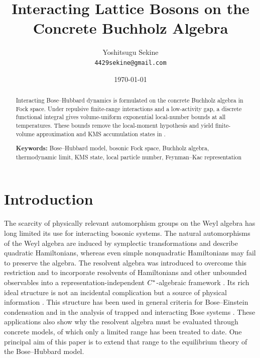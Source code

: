 \documentclass[11pt,a4paper]{article}
\title{Interacting Lattice Bosons on the Concrete Buchholz Algebra\\\vspace{0.5em}{\large All-Temperature Equilibrium States from Functional-Integral Local-Number Bounds}}
\author{%
Yoshitsugu Sekine\\{\small\texttt{4429sekine@gmail.com}}%
}
\date{\today}
\theoremstyle{plain}
\theoremstyle{definition}
\theoremstyle{remark}
\begin{document}
\maketitle

\begin{abstract}
Interacting Bose--Hubbard dynamics is formulated on the concrete Buchholz algebra in Fock space. Under repulsive finite-range interactions and a low-activity gap, a discrete functional integral gives volume-uniform exponential local-number bounds at all temperatures. These bounds remove the local-moment hypothesis and yield finite-volume approximation and KMS accumulation states in \cite{DeuchertLampartLemm001}.

\noindent\textbf{Keywords:} Bose--Hubbard model, bosonic Fock space, Buchholz algebra, thermodynamic limit, KMS state, local particle number, Feynman--Kac representation
\end{abstract}


\setcounter{tocdepth}{3}
\tableofcontents

\section{Introduction}\label{introduction}

The scarcity of physically relevant automorphism groups on the Weyl algebra has long limited its use for interacting bosonic systems. The natural automorphisms of the Weyl algebra are induced by symplectic transformations and describe quadratic Hamiltonians, whereas even simple nonquadratic Hamiltonians may fail to preserve the algebra. The resolvent algebra was introduced to overcome this restriction and to incorporate resolvents of Hamiltonians and other unbounded observables into a representation-independent \(C^{\ast}\)-algebraic framework \cite[Sections 1 and 5]{BuchholzGrundling002}. Its rich ideal structure is not an incidental complication but a source of physical information \cite{DetlevBuchholz001}. This structure has been used in general criteria for Bose--Einstein condensation and in the analysis of trapped and interacting Bose systems \cite{BahnsBuchholz001,DetlevBuchholz002,DetlevBuchholz004,DetlevBuchholz005,DetlevBuchholz012}. These applications also show why the resolvent algebra must be evaluated through concrete models, of which only a limited range has been treated to date. One principal aim of this paper is to extend that range to the equilibrium theory of the Bose--Hubbard model.
\end{document}
